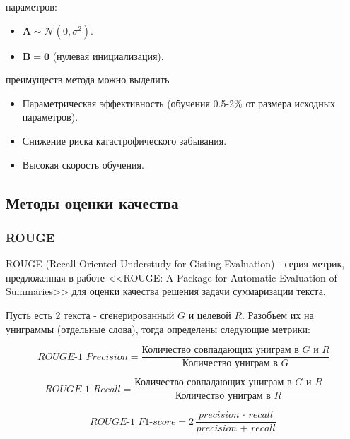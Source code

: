  параметров:
\begin{itemize}
    \item $\mathbf{A} \sim \mathcal{N}(0, \sigma^2).$
    \item $\mathbf{B} = \mathbf{0}$ (нулевая инициализация).
\end{itemize}



 преимуществ метода можно выделить
\begin{itemize}
    \item Параметрическая эффективность (обучения 0.5-2\% от размера исходных параметров).
    \item Снижение риска катастрофического забывания.
    \item Высокая скорость обучения.
\end{itemize}



\subsection{Методы оценки качества}
\label{subsec:scoring_theory} 

\subsubsection{ROUGE}
\label{subsec:rouge} 

ROUGE (Recall-Oriented Understudy for Gisting Evaluation) - серия метрик, предложенная в работе <<ROUGE: A Package for Automatic Evaluation of Summaries>> \cite{ROUGE} для оценки качества решения задачи суммаризации текста. 

Пусть есть 2 текста - сгенерированный $G$ и целевой $R$. Разобъем их на униграммы (отдельные слова), тогда определены следующие метрики:

\begin{equation}
    \textit{ROUGE-1 Precision} = \frac{\textit{Количество совпадающих униграм в $G$ и $R$}}{\textit{Количество униграм в G}}
\end{equation}

\begin{equation}
    \textit{ROUGE-1 Recall} = \frac{\textit{Количество совпадающих униграм в $G$ и $R$}}{\textit{Количество униграм в R}}
\end{equation}

\begin{equation}
    \textit{ROUGE-1 F1-score} = 2\frac{\textit{precision $\cdot$ recall}}{\textit{precision + recall}}
\end{equation}

